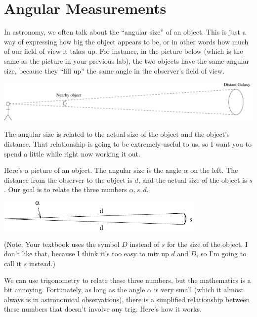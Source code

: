 \section{Angular Measurements}
\makelabheader %

In astronomy, we often talk about the ``angular size'' of an object.
This is just a way of expressing how big the object appears to be, or
in other words how much of our field of view it takes up.  For
instance, in the picture below (which is the same as the picture in
your previous lab), the two objects have the same angular size,
because they ``fill up'' the same angle in the observer's
field of view.

\medskip
\centerline{\includegraphics[width=\textwidth]{localdistance/localdistance1.pdf}}
\medskip

The angular size is related to the actual size of the object and the
object's distance.  That relationship is going to be extremely useful
to us, so I want you to spend a little while right now working it out.

Here's a picture of an object.  The angular size is the angle $\alpha$
on the left.  The distance from the observer to the object is $d$, and
the actual size of the object is $s$.  Our goal is to relate the
three numbers $\alpha,s,d$.

\medskip
\centerline{\includegraphics[width=4in]{angularsize/angularsizefig1.pdf}}
\medskip

(Note: Your textbook uses the symbol $D$ instead of $s$ for
the size of the object.  I don't like that, because I think it's
too easy to mix up $d$ and $D$, so I'm going to call it $s$ instead.)

We can use trigonometry to relate these three numbers, but the
mathematics is a bit annoying.  Fortunately, as long as the angle
$\alpha$ is very small (which it almost always is
in astronomical observations), there is a simplified
relationship between these numbers that doesn't involve
any trig.  Here's how it works.


